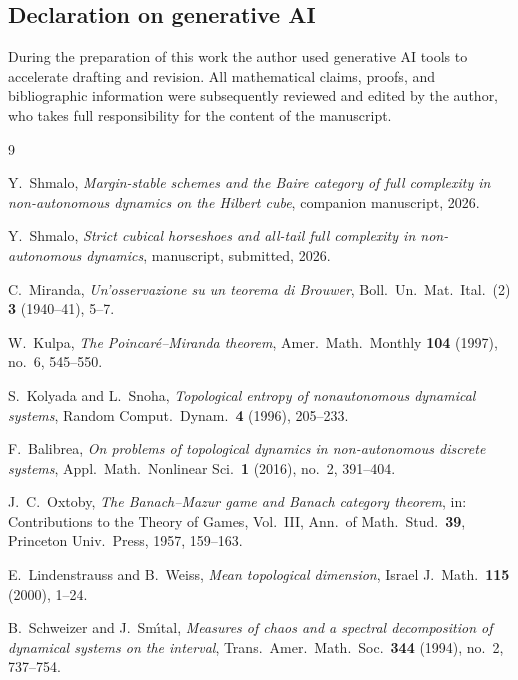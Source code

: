 \documentclass[11pt]{article}
\begin{document}
\subsection*{Declaration on generative AI}
During the preparation of this work the author used generative AI tools to accelerate
drafting and revision.  All mathematical claims, proofs, and bibliographic information
were subsequently reviewed and edited by the author, who takes full responsibility for
the content of the manuscript.

\begin{thebibliography}{9}

Y.~Shmalo,
\emph{Margin-stable schemes and the Baire category of full complexity in
non-autonomous dynamics on the Hilbert cube}, companion manuscript, 2026.

Y.~Shmalo,
\emph{Strict cubical horseshoes and all-tail full complexity in non-autonomous
dynamics}, manuscript, submitted, 2026.

C.~Miranda,
\emph{Un'osservazione su un teorema di Brouwer},
Boll.\ Un.\ Mat.\ Ital.\ (2) \textbf{3} (1940--41), 5--7.

W.~Kulpa,
\emph{The Poincar\'e--Miranda theorem},
Amer.\ Math.\ Monthly \textbf{104} (1997), no.~6, 545--550.

S.~Kolyada and L.~Snoha,
\emph{Topological entropy of nonautonomous dynamical systems},
Random Comput.\ Dynam.\ \textbf{4} (1996), 205--233.

F.~Balibrea,
\emph{On problems of topological dynamics in non-autonomous discrete systems},
Appl.\ Math.\ Nonlinear Sci.\ \textbf{1} (2016), no.~2, 391--404.

J.~C.~Oxtoby,
\emph{The Banach--Mazur game and Banach category theorem},
in: Contributions to the Theory of Games, Vol.~III,
Ann.\ of Math.\ Stud.\ \textbf{39}, Princeton Univ.\ Press, 1957, 159--163.

E.~Lindenstrauss and B.~Weiss,
\emph{Mean topological dimension},
Israel J.\ Math.\ \textbf{115} (2000), 1--24.

B.~Schweizer and J.~Sm\'\i tal,
\emph{Measures of chaos and a spectral decomposition of dynamical systems on the
interval},
Trans.\ Amer.\ Math.\ Soc.\ \textbf{344} (1994), no.~2, 737--754.

\end{thebibliography}
\end{document}

